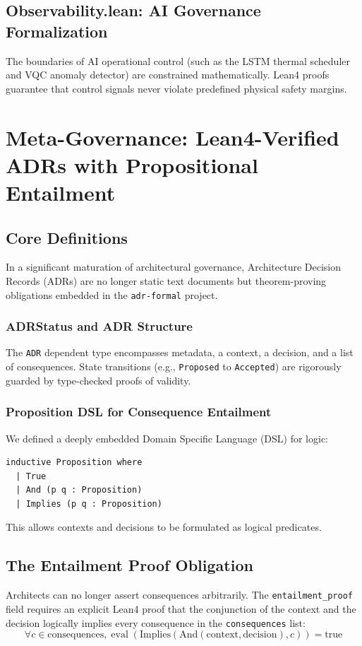 \documentclass[11pt,a4paper]{article}
\DeclareMathOperator{\eval}{eval}
\begin{document}
\subsection{Observability.lean: AI Governance Formalization}
The boundaries of AI operational control (such as the LSTM thermal scheduler and VQC anomaly detector) are constrained mathematically. Lean4 proofs guarantee that control signals never violate predefined physical safety margins.

\section{Meta-Governance: Lean4-Verified ADRs with Propositional Entailment}
\subsection{Core Definitions}
In a significant maturation of architectural governance, Architecture Decision Records (ADRs) are no longer static text documents but theorem-proving obligations embedded in the \texttt{adr-formal} project.

\subsubsection{ADRStatus and ADR Structure}
The \texttt{ADR} dependent type encompasses metadata, a context, a decision, and a list of consequences. State transitions (e.g., \texttt{Proposed} to \texttt{Accepted}) are rigorously guarded by type-checked proofs of validity.

\subsubsection{Proposition DSL for Consequence Entailment}
We defined a deeply embedded Domain Specific Language (DSL) for logic:
\begin{lstlisting}[language=ML]
inductive Proposition where
  | True
  | And (p q : Proposition)
  | Implies (p q : Proposition)
\end{lstlisting}
This allows contexts and decisions to be formulated as logical predicates.

\subsection{The Entailment Proof Obligation}
Architects can no longer assert consequences arbitrarily. The \texttt{entailment\_proof} field requires an explicit Lean4 proof that the conjunction of the context and the decision logically implies every consequence in the \texttt{consequences} list:
\begin{equation}
\forall c \in \text{consequences}, \eval(\text{Implies}(\text{And}(\text{context}, \text{decision}), c)) = \text{true}
\end{equation}
\end{document}
